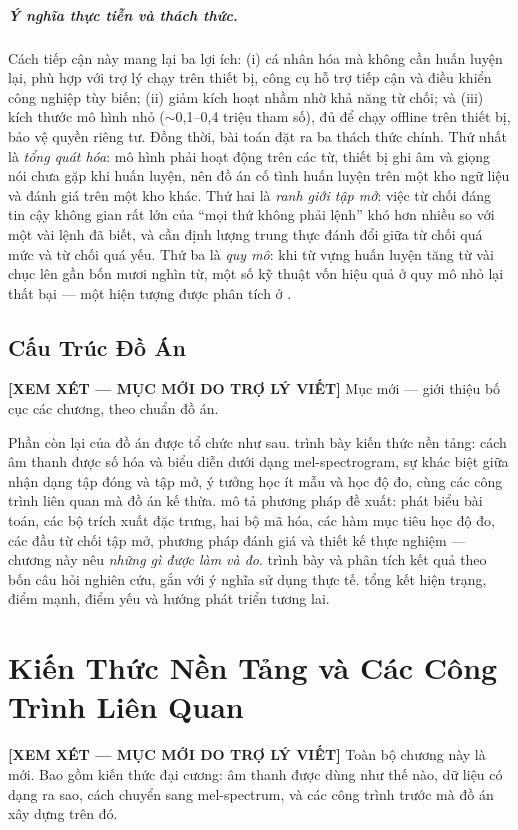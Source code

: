\documentclass[12pt,a4paper]{report}
\newcommand{\reviewnote}[1]{%
    \par\smallskip\noindent
    \colorbox{yellow!35}{\parbox{0.97\linewidth}{\small\textbf{[XEM XÉT — MỤC MỚI DO TRỢ LÝ VIẾT]}\; #1}}%
    \par\smallskip}
\newcommand{\reviewnote}[1]{}
\begin{document}
\paragraph{Ý nghĩa thực tiễn và thách thức.}
Cách tiếp cận này mang lại ba lợi ích: (i) cá nhân hóa mà không cần huấn luyện lại,
phù hợp với trợ lý chạy trên thiết bị, công cụ hỗ trợ tiếp cận và điều khiển công
nghiệp tùy biến; (ii) giảm kích hoạt nhầm nhờ khả năng từ chối; và (iii) kích
thước mô hình nhỏ ($\sim$0{,}1--0{,}4 triệu tham số), đủ để chạy offline trên thiết
bị, bảo vệ quyền riêng tư. Đồng thời, bài toán đặt ra ba thách thức chính. Thứ
nhất là \emph{tổng quát hóa}: mô hình phải hoạt động trên các từ, thiết bị ghi âm
và giọng nói chưa gặp khi huấn luyện, nên đồ án cố tình huấn luyện trên một kho
ngữ liệu và đánh giá trên một kho khác. Thứ hai là \emph{ranh giới tập
mở}: việc từ chối đáng tin cậy không gian rất lớn của ``mọi thứ không phải lệnh''
khó hơn nhiều so với một vài lệnh đã biết, và cần định lượng trung thực
đánh đổi giữa từ chối quá mức và từ chối quá yếu. Thứ ba là \emph{quy mô}: khi từ
vựng huấn luyện tăng từ vài chục lên gần bốn mươi nghìn từ, một số kỹ thuật vốn
hiệu quả ở quy mô nhỏ lại thất bại --- một hiện tượng được phân tích ở
.

\section{Cấu Trúc Đồ Án}\label{sec:thesisstruct}
\reviewnote{Mục mới --- giới thiệu bố cục các chương, theo chuẩn đồ án.}

Phần còn lại của đồ án được tổ chức như sau.  trình bày kiến
thức nền tảng: cách âm thanh được số hóa và biểu diễn dưới dạng mel-spectrogram,
sự khác biệt giữa nhận dạng tập đóng và tập mở, ý tưởng học ít mẫu và học độ đo,
cùng các công trình liên quan mà đồ án kế thừa.  mô tả phương pháp
đề xuất: phát biểu bài toán, các bộ trích xuất đặc trưng, hai bộ mã hóa, các hàm
mục tiêu học độ đo, các đầu từ chối tập mở, phương pháp đánh giá và thiết kế thực
nghiệm --- chương này nêu \emph{những gì được làm và đo}.
 trình bày và phân tích kết quả theo bốn câu hỏi nghiên cứu, gắn
với ý nghĩa sử dụng thực tế.  tổng kết hiện
trạng, điểm mạnh, điểm yếu và hướng phát triển tương lai.

\chapter{Kiến Thức Nền Tảng và Các Công Trình Liên Quan}\label{ch:background}
\reviewnote{Toàn bộ chương này là mới. Bao gồm kiến thức đại cương: âm thanh được
dùng như thế nào, dữ liệu có dạng ra sao, cách chuyển sang mel-spectrum, và các
công trình trước mà đồ án xây dựng trên đó.}
\end{document}
